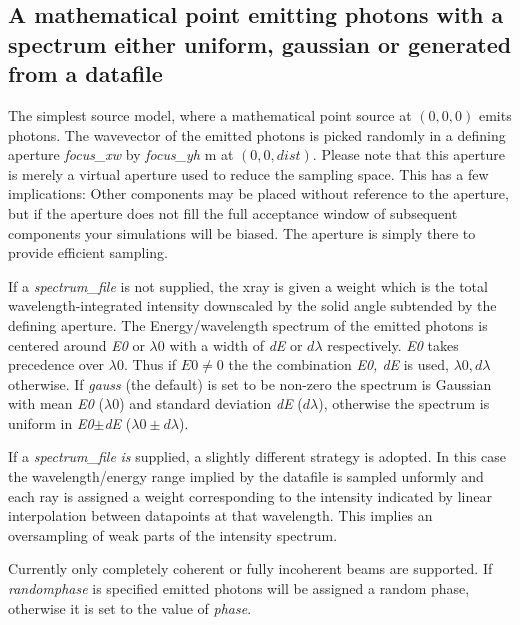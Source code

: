 \subsection*{A mathematical point emitting photons with a spectrum either uniform, gaussian or generated from a datafile}
\label{s:source-pt}
The simplest source model, where a mathematical point source at $(0,0,0)$ emits photons. The wavevector of the emitted photons
is picked randomly in a defining aperture \emph{focus\_xw} by \emph{focus\_yh} m at $(0,0,\mathit{dist})$. 
Please note that this aperture is merely a
virtual aperture used to reduce the sampling space. This has a few
implications: Other components may be placed without reference to the aperture,
but if the aperture does not fill the full acceptance window of subsequent
components your simulations will be biased. The aperture is simply there to provide efficient sampling.

If a \textit{spectrum\_file} is not supplied, the xray
is given a weight which is the total wavelength-integrated intensity downscaled
by the solid angle subtended by the defining aperture.
The Energy/wavelength spectrum of the emitted photons is centered around \textit{E0} or  $\lambda 0$ with a width of \textit{dE} or $d\lambda$ respectively. 
\textit{E0} takes precedence over $\lambda0$. Thus if $E0\neq0$ the the combination \textit{E0, dE} is used, $\lambda0,d\lambda$ otherwise.
If \textit{gauss} (the default) is set to be non-zero the spectrum is Gaussian with mean \textit{E0} ($\lambda 0$) and standard deviation \textit{dE} ($d\lambda$), otherwise the
spectrum is uniform in \textit{E0}$\pm$\textit{dE} ($\lambda 0\pm d\lambda$).

If a \textit{spectrum\_file} \emph{is} supplied, a slightly different strategy is adopted. In this case the
wavelength/energy range implied by the datafile is sampled unformly and each ray is assigned
a weight corresponding to the intensity indicated by linear interpolation between datapoints
at that wavelength. This implies an oversampling of weak parts of the intensity spectrum.

Currently only completely coherent or fully incoherent beams are supported. If
\textit{randomphase} is specified emitted photons will be assigned a random phase, otherwise it is
set to the value of \textit {phase}.

